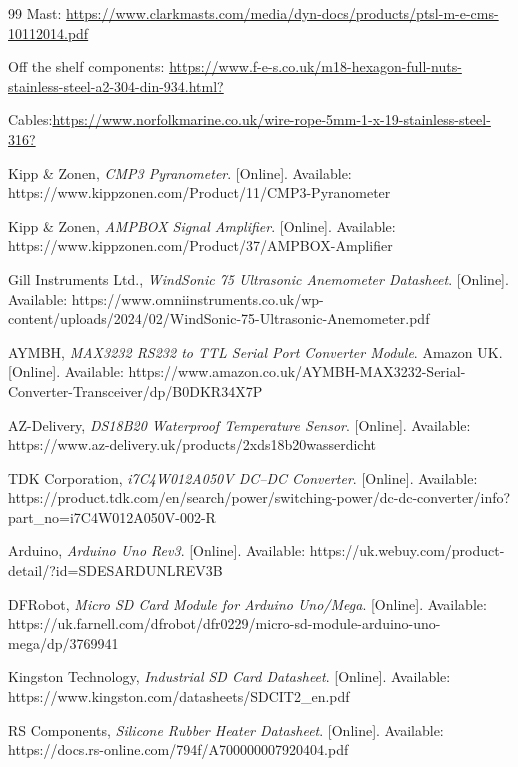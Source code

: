 \documentclass[11pt,a4paper]{article}
\begin{document}
\begin{thebibliography}{99}
Mast: \url{https://www.clarkmasts.com/media/dyn-docs/products/ptsl-m-e-cms-10112014.pdf}

Off the shelf components: \url{https://www.f-e-s.co.uk/m18-hexagon-full-nuts-stainless-steel-a2-304-din-934.html?}

Cables:\url{https://www.norfolkmarine.co.uk/wire-rope-5mm-1-x-19-stainless-steel-316?}

Kipp \& Zonen, 
\textit{CMP3 Pyranometer}. 
[Online]. Available: https://www.kippzonen.com/Product/11/CMP3-Pyranometer


Kipp \& Zonen, 
\textit{AMPBOX Signal Amplifier}. 
[Online]. Available: https://www.kippzonen.com/Product/37/AMPBOX-Amplifier

Gill Instruments Ltd., 
\textit{WindSonic 75 Ultrasonic Anemometer Datasheet}. 
[Online]. Available: https://www.omniinstruments.co.uk/wp-content/uploads/2024/02/WindSonic-75-Ultrasonic-Anemometer.pdf

AYMBH, 
\textit{MAX3232 RS232 to TTL Serial Port Converter Module}. 
Amazon UK. [Online]. Available: https://www.amazon.co.uk/AYMBH-MAX3232-Serial-Converter-Transceiver/dp/B0DKR34X7P

AZ-Delivery, 
\textit{DS18B20 Waterproof Temperature Sensor}. 
[Online]. Available: https://www.az-delivery.uk/products/2xds18b20wasserdicht




TDK Corporation, 
\textit{i7C4W012A050V DC–DC Converter}. 
[Online]. Available: https://product.tdk.com/en/search/power/switching-power/dc-dc-converter/info?part\_no=i7C4W012A050V-002-R


Arduino, 
\textit{Arduino Uno Rev3}. 
[Online]. Available: https://uk.webuy.com/product-detail/?id=SDESARDUNLREV3B



DFRobot, 
\textit{Micro SD Card Module for Arduino Uno/Mega}. 
[Online]. Available: https://uk.farnell.com/dfrobot/dfr0229/micro-sd-module-arduino-uno-mega/dp/3769941


Kingston Technology, 
\textit{Industrial SD Card Datasheet}. 
[Online]. Available: https://www.kingston.com/datasheets/SDCIT2\_en.pdf


RS Components, 
\textit{Silicone Rubber Heater Datasheet}. 
[Online]. Available: https://docs.rs-online.com/794f/A700000007920404.pdf





\end{thebibliography}
\end{document}
